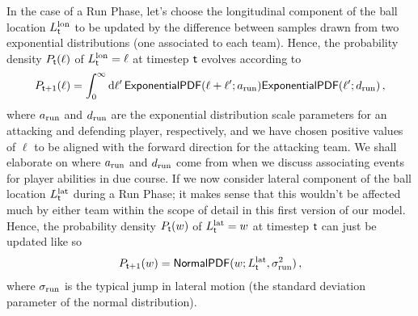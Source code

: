 In the case of a {\sf Run Phase}, let's choose the longitudinal component of the ball location $L^{\rm lon}_{{\sf t}}$ to be updated by the difference between samples drawn from two exponential distributions (one associated to each team). Hence, the probability density $P_{{\sf t}}(\ell )$ of $L^{\rm lon}_{{\sf t}}=\ell$ at timestep ${\sf t}$ evolves according to
\begin{align}
P_{{\sf t}+1}(\ell ) = \int^\infty_0 {\rm d}\ell'\, {\sf ExponentialPDF}(\ell + \ell'; a_{\rm run}){\sf ExponentialPDF}(\ell'; d_{\rm run}) \label{eq:longitudinal-motion-rugby} \,,
\end{align}
where $a_{\rm run}$ and $d_{\rm run}$ are the exponential distribution scale parameters for an attacking and defending player, respectively, and we have chosen positive values of $\ell$ to be aligned with the forward direction for the attacking team. We shall elaborate on where $a_{\rm run}$ and $d_{\rm run}$ come from when we discuss associating events for player abilities in due course. If we now consider lateral component of the ball location $L^{\rm lat}_{{\sf t}}$ during a {\sf Run Phase}; it makes sense that this wouldn't be affected much by either team within the scope of detail in this first version of our model. Hence, the probability density $P_{{\sf t}}(w)$ of $L^{\rm lat}_{{\sf t}}=w$ at timestep ${\sf t}$ can just be updated like so
\begin{align}
P_{{\sf t}+1}(w) = {\sf NormalPDF}(w; L^{\rm lat}_{{\sf t}}, \sigma_{\rm run}^2) \label{eq:lateral-motion-rugby} \,,
\end{align}
where $\sigma_{\rm run}$ is the typical jump in lateral motion (the standard deviation parameter of the normal distribution).

